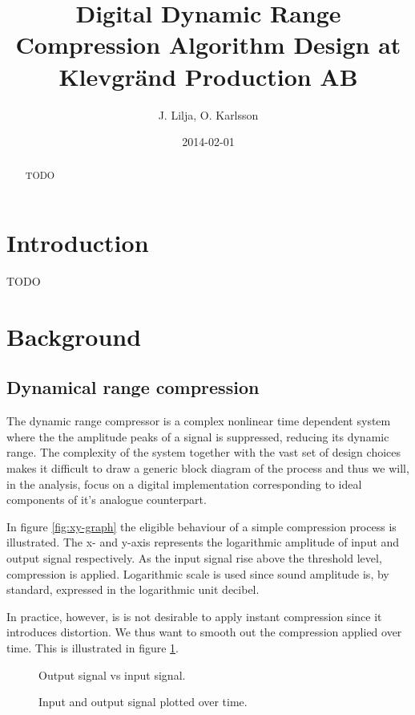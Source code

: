 \documentclass[]{article}
\begin{document}
\title{Digital Dynamic Range Compression Algorithm Design at Klevgränd Production AB}
\author{J. Lilja, O. Karlsson}
\date{2014-02-01}
\maketitle

\begin{abstract}
TODO
\end{abstract}

\clearpage
\section{Introduction}
TODO
\section{Background}
\subsection{Dynamical range compression}
The dynamic range compressor is a complex nonlinear time dependent system where the the amplitude peaks of a signal is suppressed, reducing its dynamic range. The complexity of the system together with the vast set of design choices makes it difficult to draw a generic block diagram of the process\cite{giannoullis}  and thus we will, in the analysis, focus on a digital implementation corresponding to ideal components of it's analogue counterpart. 

In figure \ref{fig:xy-graph} the eligible behaviour of a simple compression process is illustrated. The x- and y-axis represents the logarithmic amplitude of input and output signal respectively. As the input signal rise above the threshold level, compression is applied. Logarithmic scale is used since sound amplitude is, by standard, expressed in the logarithmic unit decibel.

In practice, however, is is not desirable to apply instant compression since it introduces distortion\cite{giannoullis}. We thus want to smooth out the compression applied over time. This is illustrated in figure \ref{fig:envelope-graph}.

\begin{figure}[ht]
\captionsetup{justification=centering}
\begin{minipage}[t]{.5\textwidth}
 \centering

\caption{Output signal vs input signal.} 
\label{fig:xy-graph}
\end{minipage}%
\begin{minipage}[t]{.5\textwidth}
\centering

\caption{Input and output signal plotted over time. } 
\label{fig:envelope-graph}
\end{minipage}
\end{figure}
\end{document}
